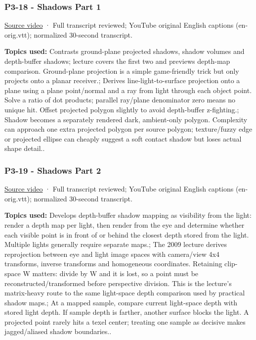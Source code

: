 \subsubsection{P3-18 - Shadows Part 1}\label{04-visual-computing-ii-ch036-p3-18---shadows-part-1}

\href{https://www.youtube.com/watch?v=kmdRmXuOjIY}{Source video} · Full transcript reviewed; YouTube original English captions (en-orig.vtt); normalized 30-second transcript.

\textbf{Topics used:} Contrasts ground-plane projected shadows, shadow volumes and depth-buffer shadows; lecture covers the first two and previews depth-map comparison. Ground-plane projection is a simple game-friendly trick but only projects onto a planar receiver.; Derives line-light-to-surface projection onto a plane using a plane point/normal and a ray from light through each object point. Solve a ratio of dot products; parallel ray/plane denominator zero means no unique hit. Offset projected polygon slightly to avoid depth-buffer z-fighting.; Shadow becomes a separately rendered dark, ambient-only polygon. Complexity can approach one extra projected polygon per source polygon; texture/fuzzy edge or projected ellipse can cheaply suggest a soft contact shadow but loses actual shape detail..

\subsubsection{P3-19 - Shadows Part 2}\label{04-visual-computing-ii-ch036-p3-19---shadows-part-2}

\href{https://www.youtube.com/watch?v=qiJhB0fOY6I}{Source video} · Full transcript reviewed; YouTube original English captions (en-orig.vtt); normalized 30-second transcript.

\textbf{Topics used:} Develops depth-buffer shadow mapping as visibility from the light: render a depth map per light, then render from the eye and determine whether each visible point is in front of or behind the closest depth stored from the light. Multiple lights generally require separate maps.; The 2009 lecture derives reprojection between eye and light image spaces with camera/view 4x4 transforms, inverse transforms and homogeneous coordinates. Retaining clip-space W matters: divide by W and it is lost, so a point must be reconstructed/transformed before perspective division. This is the lecture's matrix-heavy route to the same light-space depth comparison used by practical shadow maps.; At a mapped sample, compare current light-space depth with stored light depth. If sample depth is farther, another surface blocks the light. A projected point rarely hits a texel center; treating one sample as decisive makes jagged/aliased shadow boundaries..

